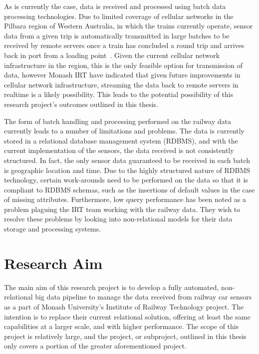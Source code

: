 As is currently the case, data is received and processed using batch data processing technologies. Due to limited coverage
of cellular networks in the Pilbara region of Western Australia, in which the trains currently operate, sensor data from
a given trip is automatically transmitted in large batches to be received by remote servers once a train has concluded a
round trip and
arrives back in port from a loading point~\cite{thomas2012taking}. Given the current cellular network infrastructure in
the region, this is the only feasible option for transmission of data, however Monash IRT have indicated that given
future improvements in cellular network infrastructure, streaming the data back to remote servers in realtime is a likely
possibility. This leads to the potential possibility of this research project's outcomes outlined in this thesis.

The form of batch handling and processing performed on the railway data currently leads to a number of limitations and
problems. The data is currently stored in a relational database management system (RDBMS), and with the current
implementation
of the sensors, the data received is not consistently structured. In fact, the only sensor data guaranteed to be received
in each batch is geographic location and time. Due to the highly structured nature of RDBMS technology, certain work-arounds
need to be performed on the data so that it is compliant to RDBMS schemas, such as the insertions of default values in
the case of missing attributes. Furthermore, low query performance has been noted as a problem plaguing the IRT team
working with the railway data. They wish to resolve these problems by looking into non-relational models for their data
storage and processing systems.





\section{Research Aim} %
\label{sec:objectives}

The main aim of this research project is to develop a fully automated, non-relational big data pipeline to manage
the data received from railway car sensors as a part of Monash University's Institute of Railway Technology project. The
intention is to replace their current relational solution, offering at least the same capabilities at a larger scale, and
with higher performance. The scope of this project is relatively large, and the project, or subproject, outlined in this
thesis only covers a portion of the greater aforementioned project.

